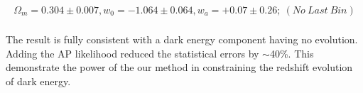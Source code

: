 \documentclass[useAMS,usenatbib]{mnras}
\begin{document}
\begin{eqnarray}
\Omega_m = 0.304 \pm 0.007, w_0 = -1.064 \pm 0.064, w_a = +0.07 \pm 0.26;\ (No\ Last\ Bin)\\
\end{eqnarray}



The result is fully consistent with a dark energy component having no evolution.
Adding the AP likelihood reduced the statistical errors by $\sim$40\%.
This demonstrate the power of the our method in constraining the redshift evolution of dark energy.

\end{document}
